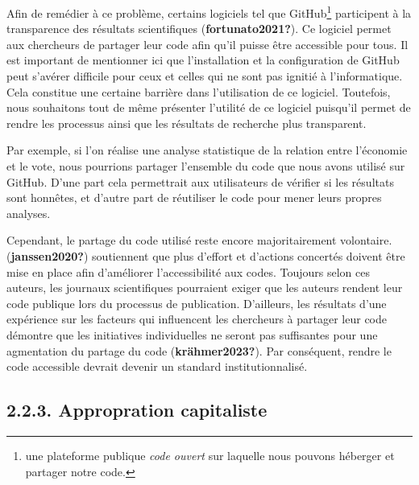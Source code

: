 \documentclass[
  letterpaper,
]{scrbook}
\begin{document}
Afin de remédier à ce problème, certains logiciels tel que
GitHub\footnote{une plateforme publique \emph{code ouvert} sur laquelle
  nous pouvons héberger et partager notre code.} participent à la
transparence des résultats scientifiques (\textbf{fortunato2021?}). Ce
logiciel permet aux chercheurs de partager leur code afin qu'il puisse
être accessible pour tous. Il est important de mentionner ici que
l'installation et la configuration de GitHub peut s'avérer difficile
pour ceux et celles qui ne sont pas ignitié à l'informatique. Cela
constitue une certaine barrière dans l'utilisation de ce logiciel.
Toutefois, nous souhaitons tout de même présenter l'utilité de ce
logiciel puisqu'il permet de rendre les processus ainsi que les
résultats de recherche plus transparent.

Par exemple, si l'on réalise une analyse statistique de la relation
entre l'économie et le vote, nous pourrions partager l'ensemble du code
que nous avons utilisé sur GitHub. D'une part cela permettrait aux
utilisateurs de vérifier si les résultats sont honnêtes, et d'autre part
de réutiliser le code pour mener leurs propres analyses.

Cependant, le partage du code utilisé reste encore majoritairement
volontaire. (\textbf{janssen2020?}) soutiennent que plus d'effort et
d'actions concertés doivent être mise en place afin d'améliorer
l'accessibilité aux codes. Toujours selon ces auteurs, les journaux
scientifiques pourraient exiger que les auteurs rendent leur code
publique lors du processus de publication. D'ailleurs, les résultats
d'une expérience sur les facteurs qui influencent les chercheurs à
partager leur code démontre que les initiatives individuelles ne seront
pas suffisantes pour une agmentation du partage du code
(\textbf{krähmer2023?}). Par conséquent, rendre le code accessible
devrait devenir un standard institutionnalisé.

\hypertarget{appropration-capitaliste}{%
\subsection{2.2.3. Appropration
capitaliste}\label{appropration-capitaliste}}
\end{document}
